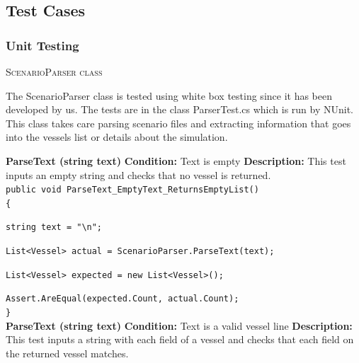\documentclass[12pt]{article}
\begin{document}
\subsection{Test Cases}

\subsubsection{Unit Testing}

\centerline{\textsc{ScenarioParser class}}
\vspace*{0.2in}

The ScenarioParser class is tested using white box testing since it has been developed by us. The tests are in the class ParserTest.cs which is run by NUnit. This class takes care parsing scenario files and extracting information that goes into the vessels list or details about the simulation.

\clearpage

{\bfseries ParseText (string text)} \newline
{\bfseries Condition:} Text is empty \newline
{\bfseries Description:} This test inputs an empty string and checks that no vessel is returned.\\

\texttt{public void ParseText\_EmptyText\_ReturnsEmptyList()}\\
\texttt{\{}\par
\texttt{string text = "\textbackslash n";}\par
\texttt{List<Vessel> actual = ScenarioParser.ParseText(text);}\par
\texttt{List<Vessel> expected = new List<Vessel>();}\par	 
\texttt{Assert.AreEqual(expected.Count, actual.Count);}\\
\texttt{\}}\\


{\bfseries ParseText (string text)} \newline
{\bfseries Condition:} Text is a valid vessel line \newline
{\bfseries Description:} This test inputs a string with each field of a vessel and checks that each field on the returned vessel matches.\\
\end{document}
